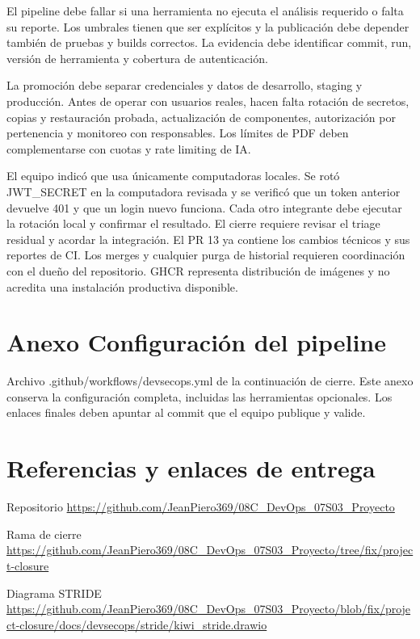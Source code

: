 \documentclass[12pt,a4paper]{article}
\begin{document}
El pipeline debe fallar si una herramienta no ejecuta el análisis requerido o falta su reporte. Los umbrales tienen que ser explícitos y la publicación debe depender también de pruebas y builds correctos. La evidencia debe identificar commit, run, versión de herramienta y cobertura de autenticación.\par
La promoción debe separar credenciales y datos de desarrollo, staging y producción. Antes de operar con usuarios reales, hacen falta rotación de secretos, copias y restauración probada, actualización de componentes, autorización por pertenencia y monitoreo con responsables. Los límites de PDF deben complementarse con cuotas y rate limiting de IA.\par
El equipo indicó que usa únicamente computadoras locales. Se rotó JWT\_SECRET en la computadora revisada y se verificó que un token anterior devuelve 401 y que un login nuevo funciona. Cada otro integrante debe ejecutar la rotación local y confirmar el resultado. El cierre requiere revisar el triage residual y acordar la integración. El PR 13 ya contiene los cambios técnicos y sus reportes de CI. Los merges y cualquier purga de historial requieren coordinación con el dueño del repositorio. GHCR representa distribución de imágenes y no acredita una instalación productiva disponible.\par
\clearpage
\clearpage
{}\section*{Anexo Configuración del pipeline}
Archivo .github/workflows/devsecops.yml de la continuación de cierre. Este anexo conserva la configuración completa, incluidas las herramientas opcionales. Los enlaces finales deben apuntar al commit que el equipo publique y valide.\par

\clearpage
\clearpage
{}\section*{Referencias y enlaces de entrega}
Repositorio \url{https://github.com/JeanPiero369/08C_DevOps_07S03_Proyecto}\par
Rama de cierre \url{https://github.com/JeanPiero369/08C_DevOps_07S03_Proyecto/tree/fix/project-closure}\par
Diagrama STRIDE \url{https://github.com/JeanPiero369/08C_DevOps_07S03_Proyecto/blob/fix/project-closure/docs/devsecops/stride/kiwi_stride.drawio}\par
\end{document}
